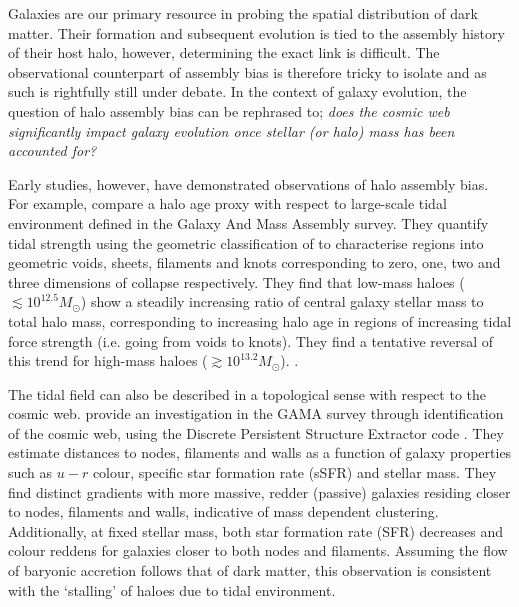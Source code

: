 Galaxies are our primary resource in probing the spatial distribution of dark matter. Their formation and subsequent evolution is tied to the assembly history of their host halo, however, determining the exact link is difficult. The observational counterpart of assembly bias is therefore tricky to isolate and as such is rightfully still under debate. In the context of galaxy evolution, the question of halo assembly bias can be rephrased to; \textit{does the cosmic web significantly impact galaxy evolution once stellar (or halo) mass has been accounted for?}

Early studies, however, have demonstrated observations of halo assembly bias. For example, \citet{tojeiro2017} compare a halo age proxy with respect to large-scale tidal environment defined in the Galaxy And Mass Assembly \citep[GAMA;][]{driver2009, driver2011} survey. They quantify tidal strength using the geometric classification of \citet{eardley2015} to characterise regions into geometric voids, sheets, filaments and knots corresponding to zero, one, two and three dimensions of collapse respectively. They find that low-mass haloes ($\lesssim 10^{12.5} M_{\odot}$) show a steadily increasing ratio of central galaxy stellar mass to total halo mass, corresponding to increasing halo age in regions of increasing tidal force strength (i.e. going from voids to knots). They find a tentative reversal of this trend for high-mass haloes ($\gtrsim 10^{13.2} M_{\odot}$). \citep[See][who explicitly look for changes in halo to stellar mass ratio with geometric environment using stacked lensing profiles, but find no significant changes when averaging over halo mass.]{brouwer2016}.

The tidal field can also be described in a topological sense with respect to the cosmic web. \citet{kraljic2018} provide an investigation in the GAMA survey through identification of the cosmic web, using the Discrete Persistent Structure Extractor code \citep[DisPerSE;][]{sousbie2011a,sousbie2011b}.  They estimate distances to nodes, filaments and walls as a function of galaxy properties such as $u - r$ colour, specific star formation rate (sSFR) and stellar mass. They find distinct gradients with more massive, redder (passive) galaxies residing closer to nodes, filaments and walls, indicative of mass dependent clustering. Additionally, at fixed stellar mass, both star formation rate (SFR) decreases and colour reddens for galaxies closer to both nodes and filaments. Assuming the flow of baryonic accretion follows that of dark matter, this observation is consistent with the `stalling' of haloes due to tidal environment.

